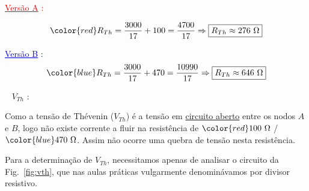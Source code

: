 \documentclass[11pt,a4paper,final]{article}
\begin{document}
\noindent\textcolor{red}{\underline{Vers\~{a}o A} : }

\begin{equation*}
\color{red}R_{Th}=\frac{3000}{17}+100=\frac{4700}{17}\Rightarrow
\boxed{R_{Th}\approx276~\Omega}
\end{equation*}

\noindent\textcolor{blue}{\underline{Vers\~{a}o B} : }
\begin{equation*}
\color{blue}R_{Th}=\frac{3000}{17}+470=\frac{10990}{17}\Rightarrow
\boxed{R_{Th}\approx646~\Omega}
\end{equation*}

~\linebreak
\noindent$V_{Th}$ :

Como a tens\~{a}o de Th\'{e}venin ($V_{Th}$) \'{e} a tens\~{a}o em \underline{circuito aberto} entre os nodos $A$ e $B$, logo n\~{a}o existe corrente a fluir na resist\^{e}ncia de $\color{red}100~\Omega$ / $\color{blue}470~\Omega$. Assim n\~{a}o ocorre uma quebra de tens\~{a}o nesta resist\^{e}ncia.

Para a determina\c{c}\~{a}o de $V_{Th}$, necessitamos apenas de analisar o circuito da Fig.~\ref{fig:vth}, que nas aulas pr\'{a}ticas vulgarmente denomin\'{a}vamos por divisor resistivo.
\end{document}
